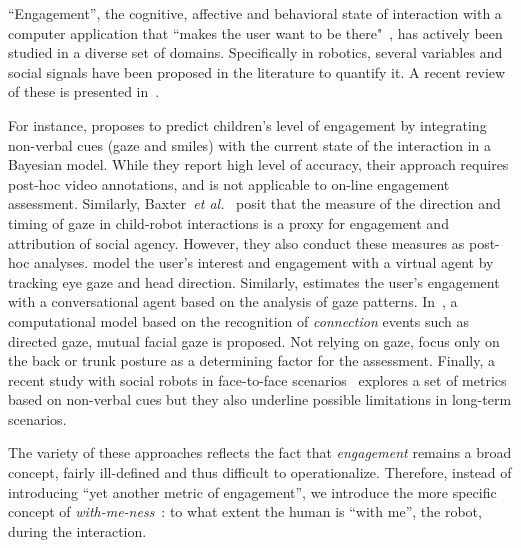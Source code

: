 \documentclass{sig-alternate}
\newcommand{\etal}{\textit{et al.}\xspace}
\begin{document}
``Engagement'', the cognitive, affective and behavioral state of interaction
with a computer application that ``makes the user want to be
there"~\cite{OBrien:2010}, has actively been studied in a diverse set of
domains. Specifically in robotics, several variables and social signals have
been proposed in the literature to quantify it. A recent review of these is
presented in~\cite{ivaldi2015towards}.


For instance, \cite{Castellano:2009} proposes to predict children's level of
engagement by integrating non-verbal cues (gaze and smiles) with the current
state of the interaction in a Bayesian model. While they report high level of
accuracy, their approach requires post-hoc video annotations, and is not
applicable to on-line engagement assessment. Similarly,
Baxter~\etal~\cite{baxter2014tracking} posit that the measure of the direction
and timing of gaze in child-robot interactions is a proxy for engagement and
attribution of social agency. However, they also conduct these measures as
post-hoc analyses.  \cite{peters2010investigating} model the user's interest and
engagement with a virtual agent by tracking eye gaze and head direction.
Similarly, \cite{ishii2011combining} estimates the user's engagement with a
conversational agent based on the analysis of gaze patterns.
In~\cite{Rich:2010}, a computational model based on the recognition of
\emph{connection} events such as directed gaze, mutual facial gaze is proposed.
Not relying on gaze, \cite{Sanghvi:2011} focus only on the back or trunk posture
as a determining factor for the assessment. Finally, a recent study with social
robots in face-to-face scenarios~\cite{anzalone} explores a set of metrics based
on non-verbal cues but they also underline possible limitations in long-term
scenarios.

The variety of these approaches reflects the fact that \emph{engagement} remains
a broad concept, fairly ill-defined and thus difficult to operationalize.
Therefore, instead of introducing ``yet another metric of engagement'', we
introduce the more specific concept of \emph{with-me-ness}~\cite{sharma2014me}:
to what extent the human is ``with me'', the robot, during the interaction.
\end{document}
